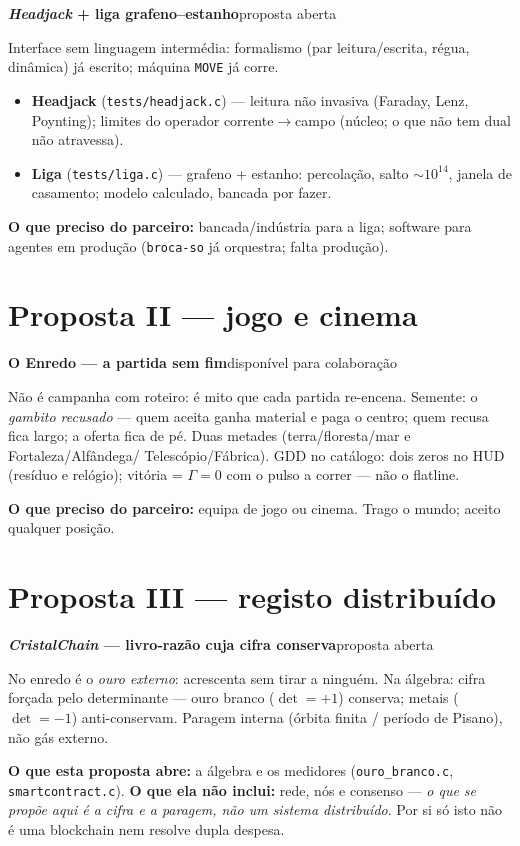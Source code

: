 \documentclass[11pt,a4paper]{article}
\newcommand{\lin}[2]{\noindent\textbf{#1}\hfill{\color{cinza}\small #2}\par}
\begin{document}
\lin{\emph{Headjack} + liga grafeno--estanho}{proposta aberta}

Interface sem linguagem intermédia: formalismo (par leitura/escrita, régua, dinâmica) já
escrito; máquina \texttt{MOVE} já corre.
\begin{itemize}
\item \textbf{Headjack} (\texttt{tests/headjack.c}) --- leitura não invasiva (Faraday, Lenz,
Poynting); limites do operador corrente$\to$campo (núcleo; o que não tem dual não atravessa).
\item \textbf{Liga} (\texttt{tests/liga.c}) --- grafeno + estanho: percolação, salto
$\sim 10^{14}$, janela de casamento; modelo calculado, bancada por fazer.
\end{itemize}

\textbf{O que preciso do parceiro:} bancada/indústria para a liga; software para agentes
em produção (\texttt{broca-so} já orquestra; falta produção).

\section*{Proposta II --- jogo e cinema}

\lin{O Enredo --- a partida sem fim}{disponível para colaboração}

Não é campanha com roteiro: é mito que cada partida re-encena. Semente: o
\emph{gambito recusado} --- quem aceita ganha material e paga o centro; quem recusa fica
largo; a oferta fica de pé. Duas metades (terra/floresta/mar e Fortaleza/Alfândega/
Telescópio/Fábrica). GDD no catálogo: dois zeros no HUD (resíduo e relógio); vitória =
$\Gamma=0$ com o pulso a correr --- não o flatline.

\smallskip
\textbf{O que preciso do parceiro:} equipa de jogo ou cinema. Trago o mundo; aceito
qualquer posição.

\section*{Proposta III --- registo distribuído}

\lin{\emph{CristalChain} --- livro-razão cuja cifra conserva}{proposta aberta}

No enredo é o \emph{ouro externo}: acrescenta sem tirar a ninguém. Na álgebra: cifra
forçada pelo determinante --- ouro branco ($\det=+1$) conserva; metais ($\det=-1$)
anti-conservam. Paragem interna (órbita finita / período de Pisano), não gás externo.

\smallskip
\textbf{O que esta proposta abre:} a álgebra e os medidores (\texttt{ouro\_branco.c},
\texttt{smartcontract.c}). \textbf{O que ela não inclui:} rede, nós e consenso ---
\emph{o que se propõe aqui é a cifra e a paragem, não um sistema distribuído}. Por si só isto
não é uma blockchain nem resolve dupla despesa.
\end{document}

